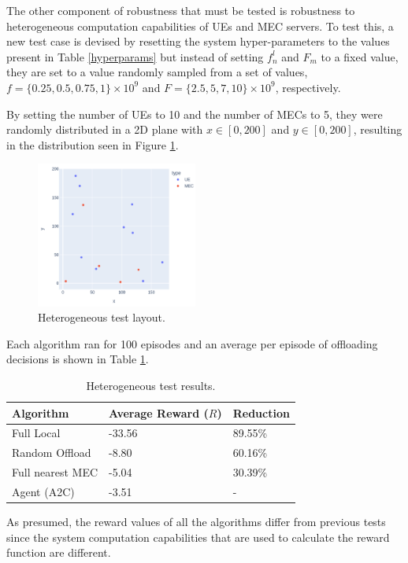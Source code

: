 \documentclass[conference]{IEEEtran}
\begin{document}
The other component of robustness that must be tested is robustness to heterogeneous computation capabilities of \acrshort{UE}s and \acrshort{MEC} servers. To test this, a new test case is devised by resetting the system hyper-parameters to the values present in Table \ref{hyperparams} but instead of setting $f^l_n$ and $F_m$ to a fixed value, they are set to a value randomly sampled from a set of values, $f = \{0.25, 0.5, 0.75, 1\} \times 10^9$ and $F = \{2.5, 5, 7, 10\} \times 10^9$, respectively.

By setting the number of \acrshort{UE}s to 10 and the number of \acrshort{MEC}s to 5, they were randomly distributed in a 2D plane with $x \in [0, 200]$ and $y \in [0, 200]$, resulting in the distribution seen in Figure \ref{hetero_test}.

\begin{figure}[H]
  \centering
  \includegraphics[width=200px]{images/5_10_layout.png}
  \caption{Heterogeneous test layout.}  \label{hetero_test}
\end{figure}

Each algorithm ran for 100 episodes and an average per episode of offloading decisions is shown in Table \ref{hetero_table}.

\begin{table}[H]
\centering
\begin{tabular}{|l|l|l|}
\hline
Algorithm        & Average Reward ($R$) & Reduction\\ \hline
Full Local       & -33.56 & 89.55\%\\
Random Offload   & -8.80 & 60.16\%\\
Full nearest MEC & -5.04 & 30.39\%\\ 
Agent (A2C) & -3.51 & -\\ \hline
\end{tabular}
\caption{Heterogeneous test results.} \label{hetero_table}
\end{table}

As presumed, the reward values of all the algorithms differ from previous tests since the system computation capabilities that are used to calculate the reward function are different.
\end{document}

